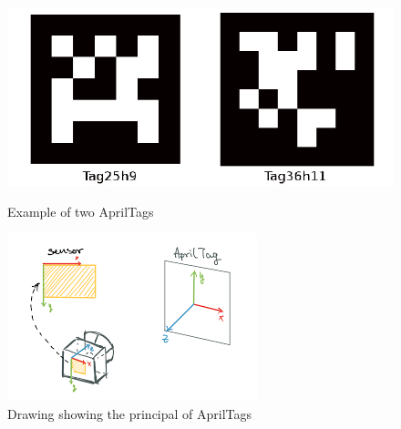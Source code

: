 \begin{figure}[H]
  \centering
  \begin{minipage}[b]{0.4\textwidth}
    \includegraphics[width=\textwidth]{Figures/images/apriltags.png}
    \caption{Example of two AprilTags}
    \label{fig:apriltags}
  \end{minipage}
  \hfill
  \begin{minipage}[b]{0.4\textwidth}
    \includegraphics[width=\textwidth]{Figures/images/apriltag_prinsipal.png}
    \caption{Drawing showing the principal of AprilTags}
    \label{fig:apriltag_principal}
  \end{minipage}
\end{figure}

